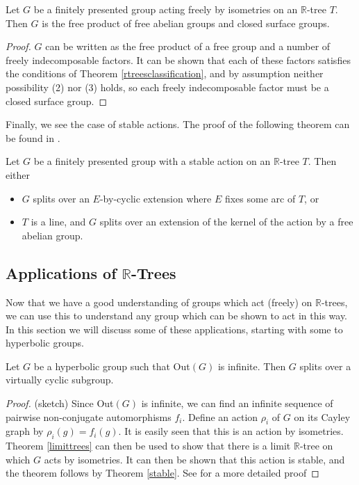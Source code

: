 \begin{theorem}
    Let $G$ be a finitely presented group acting freely by isometries on an $\mathbb{R}$-tree $T$. Then $G$ is the free product of free abelian groups and closed surface groups.
\end{theorem}
\begin{proof}
    $G$ can be written as the free product of a free group and a number of freely indecomposable factors. It can be shown that each of these factors satisfies the conditions of Theorem \ref{rtreesclassification}, and by assumption neither possibility (2) nor (3) holds, so each freely indecomposable factor must be a closed surface group. 
\end{proof}

Finally, we see the case of stable actions. The proof of the following theorem can be found in \cite{Bestvina2}.

\begin{theorem}\label{stable}
    Let $G$ be a finitely presented group with a stable action on an $\mathbb{R}$-tree $T$. Then either
    \begin{itemize}
        \item $G$ splits over an $E$-by-cyclic extension where $E$ fixes some arc of $T$, or
        \item $T$ is a line, and $G$ splits over an extension of the kernel of the action by a free abelian group.
    \end{itemize}
\end{theorem}

\subsection{Applications of $\mathbb{R}$-Trees}
Now that we have a good understanding of groups which act (freely) on $\mathbb{R}$-trees, we can use this to understand any group which can be shown to act in this way. In this section we will discuss some of these applications, starting with some to hyperbolic groups.

\begin{theorem}
    Let $G$ be a hyperbolic group such that Out$(G)$ is infinite. Then $G$ splits over a virtually cyclic subgroup.
\end{theorem}

\begin{proof} (sketch)
    Since Out$(G)$ is infinite, we can find an infinite sequence of pairwise non-conjugate automorphisms $f_i$. Define an action $\rho_i$ of $G$ on its Cayley graph by $\rho_i(g)=f_i(g)$. It is easily seen that this is an action by isometries. Theorem \ref{limittrees} can then be used to show that there is a limit $\mathbb{R}$-tree on which $G$ acts by isometries. It can then be shown that this action is stable, and the theorem follows by Theorem \ref{stable}. See \cite{BridsonSwarup} for a more detailed proof
\end{proof}

